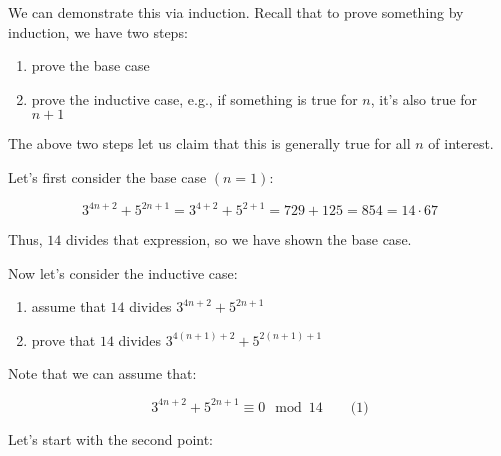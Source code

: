 We can demonstrate this via induction. Recall that to prove something by
induction, we have two steps:

\begin{enumerate}
\item prove the base case
\item prove the inductive case, e.g., if something is true for $n$, it's also
      true for $n+1$
\end{enumerate}

The above two steps let us claim that this is generally true for all $n$ of
interest.

Let's first consider the base case $(n = 1)$:

$$
  3^{4n + 2} + 5^{2n + 1} = 3^{4 + 2} + 5^{2 + 1} = 729 + 125 = 854 = 14 \cdot 67
$$

Thus, $14$ divides that expression, so we have shown the base case.

Now let's consider the inductive case:

\begin{enumerate}
\item assume that $14$ divides $3^{4n + 2} + 5^{2n + 1}$
\item prove that $14$ divides $3^{4(n+1) + 2} + 5^{2(n+1) + 1}$
\end{enumerate}

Note that we can assume that:

$$
  3^{4n + 2} + 5^{2n + 1} \equiv 0 \mod 14 \qquad \text{(1)}
$$

Let's start with the second point:

